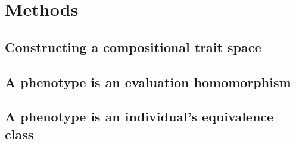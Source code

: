 \section{Methods}
\label{sec:methods}
\subsection{Constructing a compositional trait space}


\subsection{A phenotype is an evaluation homomorphism}


\subsection{A phenotype is an individual's equivalence class}
